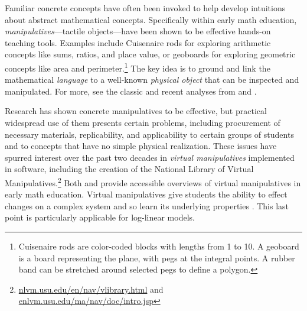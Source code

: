 \documentclass[11pt,letterpaper]{article}
\newcommand{\Note}[1]{}
\renewcommand{\Note}[1]{\hl{[#1]}}  %
\newcommand{\NoteSigned}[3]{{\sethlcolor{#2}\Note{#1: #3}}}
\newcommand{\NoteFF}[1]{\NoteSigned{FF}{LightBlue}{#1}}
\newcommand{\NoteJE}[1]{\NoteSigned{JE}{LightGreen}{#1}}
\begin{document}
Familiar concrete concepts have often been invoked to help develop
intuitions about abstract mathematical concepts.  Specifically within
early math education, \textit{manipulatives}---tactile objects---have
been shown to be effective hands-on teaching tools. Examples include
Cuisenaire rods for exploring arithmetic concepts like sums, ratios,
and place value, or geoboards for exploring geometric concepts like
area and perimeter.\footnote{Cuisenaire rods are color-coded blocks
  with lengths from 1 to 10.  A geoboard is a board representing the
  plane, with pegs at the integral points.  A rubber band can be
  stretched around selected pegs to define a polygon.} The key idea is
to ground and link the mathematical \textit{language} to a well-known
\textit{physical object} that can be inspected and manipulated.  For
more, see the classic and recent analyses from
 and .

Research has shown concrete manipulatives to be effective, but practical widespread use of them presents certain 
problems, including procurement of necessary materials, replicability,
and applicability to certain groups of students and to concepts
that have no simple physical realization. These issues
have spurred interest over the past two decades in
\textit{virtual manipulatives} implemented in software, including the creation of 
the National Library of Virtual Manipulatives.\footnote{\url{nlvm.usu.edu/en/nav/vlibrary.html} and 
\url{enlvm.usu.edu/ma/nav/doc/intro.jsp}} 
Both  and  provide accessible overviews of 
virtual manipulatives in early math education. 
Virtual manipulatives give students the ability to effect changes on a
complex system and so learn its underlying 
properties \cite{moyer2002virtual}. This last point is particularly applicable for log-linear models.

\end{document}
